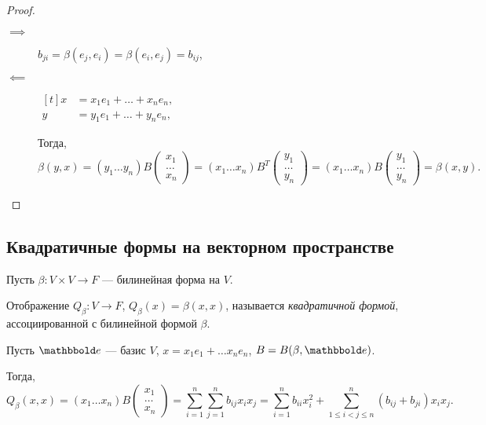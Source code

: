 \begin{proof}~
    \begin{description}
    \item[$\implies$] $b_{ji} = \beta(e_j, e_i) = \beta(e_i, e_j) = b_{ij}$, 
    \item[$\impliedby$] 
        \begin{math}
            \begin{aligned}[t]
                x &= x_1 e_1 + \dots + x_n e_n, \\
                y &= y_1 e_1 + \dots + y_n e_n,
            \end{aligned}
        \end{math}

        Тогда, 
        \begin{equation*}
            \beta(y, x) = (y_1 \dots y_n) B \begin{pmatrix} x_1 \\ \dots \\ x_n \end{pmatrix} = (x_1 \dots x_n) B^{T} \begin{pmatrix} y_1 \\ \dots \\ y_n \end{pmatrix} = (x_1 \dots x_n) B \begin{pmatrix} y_1 \\ \dots \\ y_n \end{pmatrix} = \beta(x, y)
        .\end{equation*}
    \end{description}
\end{proof}


\subsection{Квадратичные формы на векторном пространстве}

Пусть $\beta \colon V \times V \to F$ --- билинейная форма на $V$.

\begin{definition}
    Отображение $Q_\beta \colon V \to F$, $Q_\beta(x) = \beta(x, x)$, называется \textit{квадратичной формой}, ассоциированной с билинейной формой $\beta$.
\end{definition}

Пусть $\E$ --- базис $V$, $x = x_1 e_1 + \dots x_n e_n$, $B = B(\beta, \E)$.

Тогда,
\begin{equation*}
    Q_\beta(x, x) = (x_1 \dots x_n) B \begin{pmatrix} x_1 \\ \dots \\ x_n \end{pmatrix} = \sum_{i = 1}^{n} \sum_{j = 1}^{n} b_{ij} x_i x_j = \sum_{i = 1}^{n} b_{ii} x_i^2 + \sum_{1 \leq i < j \leq n}^{n} (b_{ij} + b_{ji}) x_i x_j
.\end{equation*}


